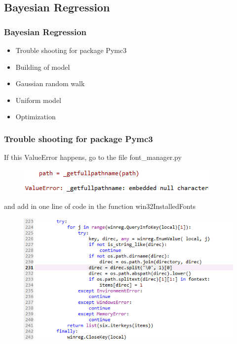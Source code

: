 \documentclass{beamer}
\begin{document}
\subsection{Bayesian Regression}
\begin{frame}
\frametitle{Bayesian Regression}
\begin{itemize}
	\item Trouble shooting for package Pymc3
	\item Building of model
	\item Gaussian random walk
	\item Uniform model
	\item Optimization
\end{itemize}
\end{frame}

\begin{frame}
\frametitle{Trouble shooting for package Pymc3}
If this ValueError happens, go to the file font\_manager.py
\begin{figure}[H]
	\includegraphics[scale=0.7]{pymc_error_1.png}
\end{figure}
and add in one line of code in the function win32InstalledFonts
\begin{figure}[H]
	\includegraphics[scale=0.65]{pymc_error_2.png}
\end{figure}
\end{frame}
\end{document}
